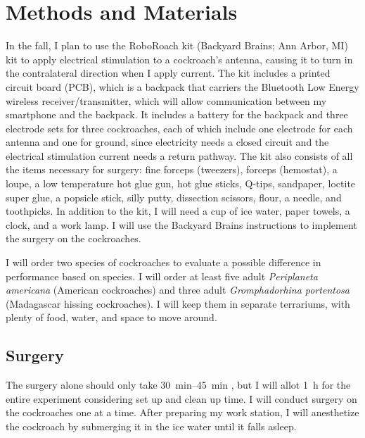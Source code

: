 \section{Methods and Materials}
\label{sec:methods}




In the fall, I plan to use the RoboRoach kit (Backyard Brains; Ann Arbor, MI) kit to apply electrical stimulation to a cockroach's antenna, causing it to turn in the contralateral direction when I apply current. The kit includes a printed circuit board (PCB), which is a backpack that carriers the Bluetooth Low Energy wireless receiver/transmitter, which will allow communication between my smartphone and the backpack. It includes a battery for the backpack and three electrode sets for three cockroaches, each of which include one electrode for each antenna and one for ground, since electricity needs a closed circuit and the electrical stimulation current needs a return pathway. The kit also consists of all the items necessary for surgery: fine forceps (tweezers), forceps (hemostat), a loupe, a low temperature hot glue gun, hot glue sticks, Q-tips, sandpaper, loctite super glue, a popsicle stick, silly putty, dissection scissors, flour, a needle, and toothpicks. In addition to the kit, I will need a cup of ice water, paper towels, a clock, and a work lamp. I will use the Backyard Brains instructions to implement the surgery on the cockroaches.

I will order two species of cockroaches to evaluate a possible difference in performance based on species. I will order at least five adult \emph{Periplaneta americana} (American cockroaches) and three adult \emph{Gromphadorhina portentosa} (Madagascar hissing cockroaches). I will keep them in separate terrariums, with plenty of food, water, and space to move around.

\subsection{Surgery}

The surgery alone should only take \SIrange{30}{45}{\minute} , but I will allot \SI{1}{\hour} for the entire experiment considering set up and clean up time. I will conduct surgery on the cockroaches one at a time. After preparing my work station, I will anesthetize the cockroach by submerging it in the ice water until it falls asleep. 

